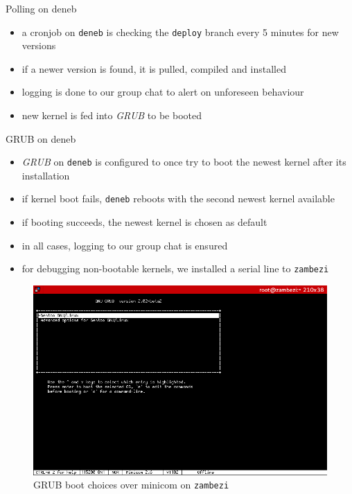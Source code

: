 \begin{frame}{Polling on deneb}
	\begin{itemize}
		\item a cronjob on \texttt{deneb} is checking the \texttt{deploy} branch every 5 minutes for new versions
		\item if a newer version is found, it is pulled, compiled and installed
		\item logging is done to our group chat to alert on unforeseen behaviour
		\item new kernel is fed into \textit{GRUB} to be booted
	\end{itemize}
\end{frame}

\begin{frame}{GRUB on deneb}
	\begin{itemize}
		\item \textit{GRUB} on \texttt{deneb} is configured to once try to boot the newest kernel after its installation
		\item if kernel boot fails, \texttt{deneb} reboots with the second newest kernel available
		\item if booting succeeds, the newest kernel is chosen as default
		\item in all cases, logging to our group chat is ensured
		\item for debugging non-bootable kernels, we installed a serial line to \texttt{zambezi}
	\end{itemize}
\end{frame}

\begin{frame}
	\begin{figure}[h]
		\includegraphics[width=.8\textwidth]{img/serialGRUB.png}
		\caption{GRUB boot choices over minicom on \texttt{zambezi}}
		\label{fig:serialGRUB}
	\end{figure}
\end{frame}

